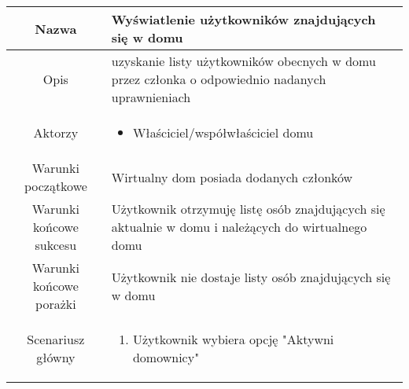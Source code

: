 \documentclass{article}
\begin{document}
\begin{enumerate}
\begin{enumerate}
				\begin{table}[H]
					\centering
					\begin{tabular}{|c|p{7cm}|}
						\hline
						Nazwa                   & \textbf{Wyświatlenie użytkowników znajdujących się w domu}                                                                                                                                                                                                                                        \\
						\hline
						Opis                    & uzyskanie listy użytkowników obecnych w domu przez członka o odpowiednio nadanych uprawnieniach                                                                                                                                                                                                   \\
						\hline
						Aktorzy                 & \begin{itemize}\item Właściciel/współwłaściciel domu\end{itemize}                                                                                                                                                                                                                                 \\
						\hline
						Warunki początkowe      & Wirtualny dom posiada dodanych członków                                                                                                                                                                                                                                                           \\
						\hline
						Warunki końcowe sukcesu & Użytkownik otrzymuję listę osób znajdujących się aktualnie w domu i należących do wirtualnego domu                                                                                                                                                                                                \\
						\hline
						Warunki końcowe porażki & Użytkownik nie dostaje listy osób znajdujących się w domu                                                                                                                                                                                                                                         \\
						\hline
						Scenariusz główny       & \begin{enumerate}\item Użytkownik wybiera opcję "Aktywni domownicy"


\end{enumerate}
\end{tabular}
\end{table}
\end{enumerate}
\end{enumerate}
\end{document}
